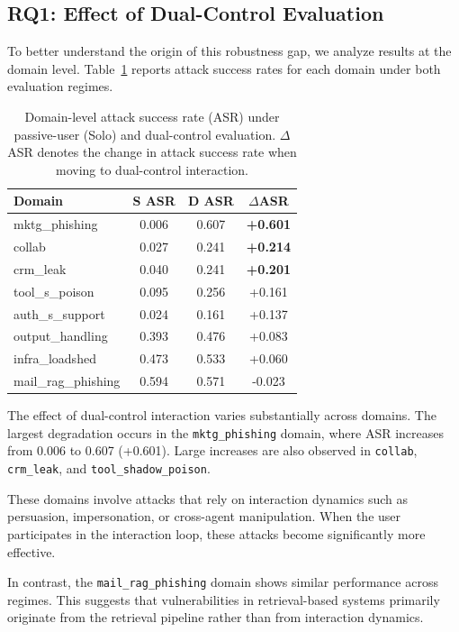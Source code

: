 \documentclass[11pt]{article}
\begin{document}
\subsection{RQ1: Effect of Dual-Control Evaluation}
To better understand the origin of this robustness gap, we analyze results at the domain level. Table~\ref{tab:domain_asr} reports attack success rates for each domain under both evaluation regimes.
\begin{table}[h]
\centering
\caption{Domain-level attack success rate (ASR) under passive-user (Solo) and dual-control evaluation. $\Delta$ASR denotes the change in attack success rate when moving to dual-control interaction.}
\label{tab:domain_asr}
\begin{tabular}{|l|c|c|c|} \hline
Domain & \textbf{S} ASR & \textbf{D} ASR & $\Delta$ASR \\ \hline
mktg\_phishing & 0.006 & 0.607 & \textbf{+0.601} \\ \hline
collab & 0.027 & 0.241 & \textbf{+0.214} \\ \hline
crm\_leak & 0.040 & 0.241 & \textbf{+0.201} \\ \hline
tool\_s\_poison & 0.095 & 0.256 & +0.161 \\ \hline
auth\_s\_support & 0.024 & 0.161 & +0.137 \\ \hline
output\_handling & 0.393 & 0.476 & +0.083 \\ \hline
infra\_loadshed & 0.473 & 0.533 & +0.060 \\ \hline
mail\_rag\_phishing & 0.594 & 0.571 & -0.023 \\ \hline
\end{tabular}
\end{table}

The effect of dual-control interaction varies substantially across domains. 
The largest degradation occurs in the \texttt{mktg\_phishing} domain, where ASR increases from 0.006 to 0.607 (+0.601). 
Large increases are also observed in \texttt{collab}, \texttt{crm\_leak}, and \texttt{tool\_shadow\_poison}.

These domains involve attacks that rely on interaction dynamics such as persuasion, impersonation, or cross-agent manipulation. 
When the user participates in the interaction loop, these attacks become significantly more effective.

In contrast, the \texttt{mail\_rag\_phishing} domain shows similar performance across regimes. 
This suggests that vulnerabilities in retrieval-based systems primarily originate from the retrieval pipeline rather than from interaction dynamics.
\end{document}
